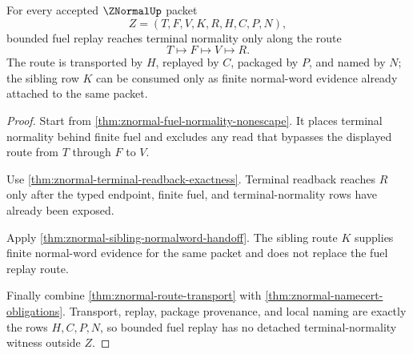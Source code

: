 \begin{theorem}
\label{thm:znormal-fuel-replay-exactness}
For every accepted $\ZNormalUp$ packet
$$
Z=(T,F,V,K,R,H,C,P,N),
$$
bounded fuel replay reaches terminal normality only along the route
$$
T \longmapsto F \longmapsto V \longmapsto R.
$$
The route is transported by $H$, replayed by $C$, packaged by $P$, and named by $N$; the sibling row $K$ can be consumed only as finite normal-word evidence already attached to the same packet.
\end{theorem}
\begin{proof}
Start from \autoref{thm:znormal-fuel-normality-nonescape}. It places terminal normality behind finite fuel and excludes any read that bypasses the displayed route from $T$ through $F$ to $V$.

Use \autoref{thm:znormal-terminal-readback-exactness}. Terminal readback reaches $R$ only after the typed endpoint, finite fuel, and terminal-normality rows have already been exposed.

Apply \autoref{thm:znormal-sibling-normalword-handoff}. The sibling route $K$ supplies finite normal-word evidence for the same packet and does not replace the fuel replay route.

Finally combine \autoref{thm:znormal-route-transport} with \autoref{thm:znormal-namecert-obligations}. Transport, replay, package provenance, and local naming are exactly the rows $H,C,P,N$, so bounded fuel replay has no detached terminal-normality witness outside $Z$.
\end{proof}

